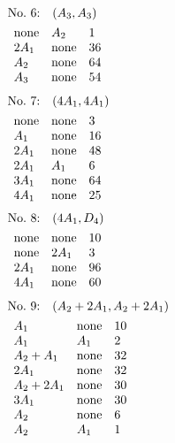 %
%
\begin{align*}
&\hbox to 4cm {\textrm{No.~6:}\quad$(A_{3}, A_{3})$\hss}\\ 
&\begin{array}{lll}
\none & A_{2} & 1\\
2A_{1} & \none & 36\\
A_{2} & \none & 64\\
A_{3} & \none & 54\\
\end{array}
\end{align*}
%
%
\begin{align*}
&\hbox to 4cm {\textrm{No.~7:}\quad$(4A_{1}, 4A_{1})$\hss}\\ 
&\begin{array}{lll}
\none & \none & 3\\
A_{1} & \none & 16\\
2A_{1} & \none & 48\\
2A_{1} & A_{1} & 6\\
3A_{1} & \none & 64\\
4A_{1} & \none & 25\\
\end{array}
\end{align*}
%
%
\begin{align*}
&\hbox to 4cm {\textrm{No.~8:}\quad$(4A_{1}, D_{4})$\hss}\\ 
&\begin{array}{lll}
\none & \none & 10\\
\none & 2A_{1} & 3\\
2A_{1} & \none & 96\\
4A_{1} & \none & 60\\
\end{array}
\end{align*}
%
%
\begin{align*}
&\hbox to 4cm {\textrm{No.~9:}\quad$(A_{2}+2A_{1}, A_{2}+2A_{1})$\hss}\\ 
&\begin{array}{lll}
A_{1} & \none & 10\\
A_{1} & A_{1} & 2\\
A_{2}+A_{1} & \none & 32\\
2A_{1} & \none & 32\\
A_{2}+2A_{1} & \none & 30\\
3A_{1} & \none & 30\\
A_{2} & \none & 6\\
A_{2} & A_{1} & 1\\
\end{array}
\end{align*}
